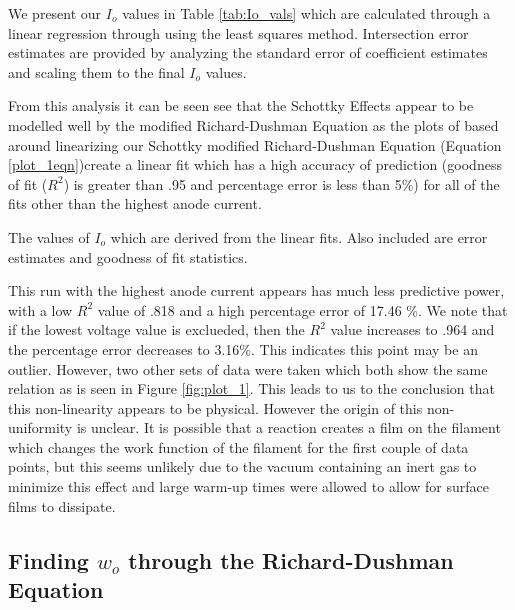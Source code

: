 We present our $I_o$ values in  Table \ref{tab:Io_vals} which are calculated through a linear regression through using the least squares method. Intersection error estimates are provided by analyzing the standard error of coefficient estimates and scaling them to the final $I_o$ values. 

From this analysis it can be seen see that the Schottky Effects appear to be modelled well by the modified Richard-Dushman Equation as the plots of based around linearizing our Schottky modified Richard-Dushman Equation (Equation \ref{plot_1eqn})create a linear fit which has a high accuracy of prediction (goodness of fit ($R^2$) is greater than .95 and percentage error is less than 5\%) for all of the fits other than the highest anode current.
\begin{table}[h]

  \footnotesize{
        
        
    }
\caption{The values of $I_o$ which are derived from the linear fits. Also included are error estimates and goodness of fit statistics.}%
\label{tab:Io_vals}
\end{table}

This run with the highest anode current appears has much less predictive power, with a low $R^2$ value of .818 and a high percentage error of 17.46 \%. We note that if the lowest voltage value is exclueded, then the $R^2$ value increases to .964 and the percentage error decreases to 3.16\%. This indicates this point may be an outlier. However, two other sets of data were taken which both show the same relation as is seen in Figure \ref{fig:plot_1}. This leads to us to the conclusion that this non-linearity appears to be physical. However the origin of this non-uniformity is unclear. It is possible that a reaction creates a film on the filament which changes the work function of the filament for the first couple of data points, but this seems unlikely due to the vacuum containing an inert gas to minimize this effect and large warm-up times were allowed to allow for surface films to dissipate.
 \par
 
\subsection{Finding $w_o$ through the Richard-Dushman Equation}

